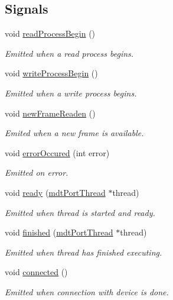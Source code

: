 \subsection*{Signals}
\begin{DoxyCompactItemize}
\item 
void \hyperlink{classmdt_port_thread_abb7234a12814f5c7c98bd6c1c2ccb776}{readProcessBegin} ()
\begin{DoxyCompactList}\small\item\em Emitted when a read process begins. \end{DoxyCompactList}\item 
void \hyperlink{classmdt_port_thread_aa01aac7e1a26deb823be40e6cb01b255}{writeProcessBegin} ()
\begin{DoxyCompactList}\small\item\em Emitted when a write process begins. \end{DoxyCompactList}\item 
void \hyperlink{classmdt_port_thread_a7fc2245c753fd65e1beffec211c41461}{newFrameReaden} ()
\begin{DoxyCompactList}\small\item\em Emited when a new frame is available. \end{DoxyCompactList}\item 
void \hyperlink{classmdt_port_thread_ab31cbe1a85aa830cd368654d1f806326}{errorOccured} (int error)
\begin{DoxyCompactList}\small\item\em Emitted on error. \end{DoxyCompactList}\item 
\hypertarget{classmdt_port_thread_ae71ae3aa58eb1f409a2b128e6ef3148b}{
void \hyperlink{classmdt_port_thread_ae71ae3aa58eb1f409a2b128e6ef3148b}{ready} (\hyperlink{classmdt_port_thread}{mdtPortThread} $\ast$thread)}
\label{classmdt_port_thread_ae71ae3aa58eb1f409a2b128e6ef3148b}

\begin{DoxyCompactList}\small\item\em Emitted when thread is started and ready. \end{DoxyCompactList}\item 
\hypertarget{classmdt_port_thread_a4266192826f09d8186ee8f9b646ac089}{
void \hyperlink{classmdt_port_thread_a4266192826f09d8186ee8f9b646ac089}{finished} (\hyperlink{classmdt_port_thread}{mdtPortThread} $\ast$thread)}
\label{classmdt_port_thread_a4266192826f09d8186ee8f9b646ac089}

\begin{DoxyCompactList}\small\item\em Emitted when thread has finished executing. \end{DoxyCompactList}\item 
void \hyperlink{classmdt_port_thread_a88070ed43976a83b6e4d289d6f1827bd}{connected} ()
\begin{DoxyCompactList}\small\item\em Emitted when connection with device is done. \end{DoxyCompactList}\end{DoxyCompactItemize}
